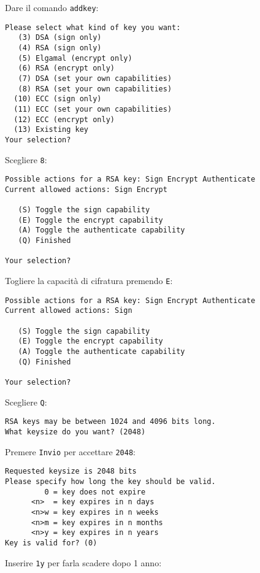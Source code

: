 Dare il comando \texttt{addkey}:

\begin{lstlisting}
Please select what kind of key you want:
   (3) DSA (sign only)
   (4) RSA (sign only)
   (5) Elgamal (encrypt only)
   (6) RSA (encrypt only)
   (7) DSA (set your own capabilities)
   (8) RSA (set your own capabilities)
  (10) ECC (sign only)
  (11) ECC (set your own capabilities)
  (12) ECC (encrypt only)
  (13) Existing key
Your selection?
\end{lstlisting}

Scegliere \texttt{8}:

\begin{lstlisting}
Possible actions for a RSA key: Sign Encrypt Authenticate
Current allowed actions: Sign Encrypt

   (S) Toggle the sign capability
   (E) Toggle the encrypt capability
   (A) Toggle the authenticate capability
   (Q) Finished

Your selection?
\end{lstlisting}

Togliere la capacità di cifratura premendo \texttt{E}:

\begin{lstlisting}
Possible actions for a RSA key: Sign Encrypt Authenticate
Current allowed actions: Sign

   (S) Toggle the sign capability
   (E) Toggle the encrypt capability
   (A) Toggle the authenticate capability
   (Q) Finished

Your selection?
\end{lstlisting}

Scegliere \texttt{Q}:

\begin{lstlisting}
RSA keys may be between 1024 and 4096 bits long.
What keysize do you want? (2048)
\end{lstlisting}

Premere \texttt{Invio} per accettare \texttt{2048}:

\begin{lstlisting}
Requested keysize is 2048 bits
Please specify how long the key should be valid.
         0 = key does not expire
      <n>  = key expires in n days
      <n>w = key expires in n weeks
      <n>m = key expires in n months
      <n>y = key expires in n years
Key is valid for? (0)
\end{lstlisting}

Inserire \texttt{1y} per farla scadere dopo 1 anno:

